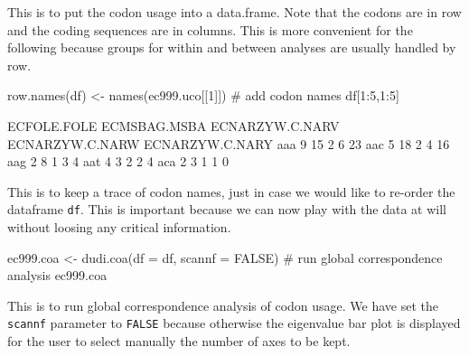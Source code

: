 \documentclass{article}
\begin{document}
This is to put the codon usage into a data.frame. Note that the codons are in row
and the coding sequences are in columns. This is more convenient for the following
because groups for within and between analyses are usually handled by row.

\begin{Schunk}
\begin{Sinput}
 row.names(df) <- names(ec999.uco[[1]]) # add codon names
 df[1:5,1:5]
\end{Sinput}
\begin{Soutput}
    ECFOLE.FOLE ECMSBAG.MSBA ECNARZYW.C.NARV ECNARZYW.C.NARW ECNARZYW.C.NARY
aaa           9           15               2               6              23
aac           5           18               2               4              16
aag           2            8               1               3               4
aat           4            3               2               2               4
aca           2            3               1               1               0
\end{Soutput}
\end{Schunk}

This is to keep a trace of codon names, just in case we would like to re-order
the dataframe \texttt{df}. This is important because we can now play with
the data at will without loosing any critical information. 

\begin{Schunk}
\begin{Sinput}
 ec999.coa <- dudi.coa(df = df, scannf = FALSE) # run global correspondence analysis
 ec999.coa
\end{Sinput}
\end{Schunk}

This is to run global correspondence analysis of codon usage.
We have set the \texttt{scannf} parameter to \texttt{FALSE}
because otherwise the eigenvalue bar plot is displayed for the
user to select manually the number of axes to be kept.
\end{document}
